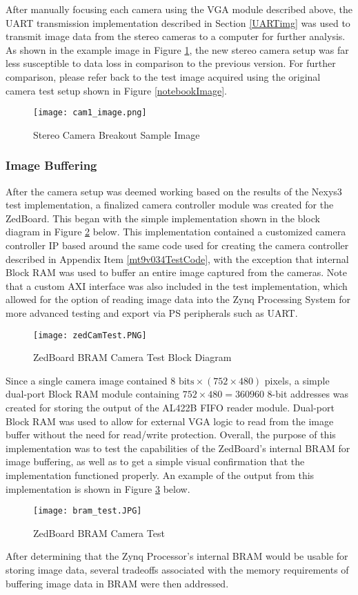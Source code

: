 \par
After manually focusing each camera using the VGA module described above, the UART transmission implementation described in Section \ref{UARTimg} was used to transmit image data from the stereo cameras to a computer for further analysis. As shown in the example image in Figure \ref{newBoardImage}, the new stereo camera setup was far less susceptible to data loss in comparison to the previous version. For further comparison, please refer back to the test image acquired using the original camera test setup shown in Figure \ref{notebookImage}.
\begin{figure}[H] 
	\centering
	\texttt{[image: cam1\_image.png]}
	\caption{Stereo Camera Breakout Sample Image}
	\label{newBoardImage}
\end{figure}

\subsubsection{Image Buffering}
After the camera setup was deemed working based on the results of the Nexys3 test implementation, a finalized camera controller module was created for the ZedBoard. This began with the simple implementation shown in the block diagram in Figure \ref{zedCamTest} below. This implementation contained a customized camera controller IP based around the same code used for creating the camera controller described in Appendix Item \ref{mt9v034TestCode}, with the exception that internal Block RAM was used to buffer an entire image captured from the cameras. Note that a custom AXI interface was also included in the test implementation, which allowed for the option of reading image data into the Zynq Processing System for more advanced testing and export via PS peripherals such as UART. 
\begin{figure}[H] 
	\centering
	\texttt{[image: zedCamTest.PNG]}
	\caption{ZedBoard BRAM Camera Test Block Diagram}
	\label{zedCamTest}
\end{figure}
\par
Since a single camera image contained $8 \textrm{ bits} \times (752\times 480)$ pixels, a simple dual-port Block RAM module containing $752\times480=360960$ 8-bit addresses was created for storing the output of the AL422B FIFO reader module. Dual-port Block RAM was used to allow for external VGA logic to read from the image buffer without the need for read/write protection. Overall, the purpose of this implementation was to test the capabilities of the ZedBoard's internal BRAM for image buffering, as well as to get a simple visual confirmation that the implementation functioned properly. An example of the output from this implementation is shown in Figure \ref{bramCamTest} below. 
\begin{figure}[H] 
	\centering
	\texttt{[image: bram\_test.JPG]}
	\caption{ZedBoard BRAM Camera Test}
	\label{bramCamTest}
\end{figure}
\par
After determining that the Zynq Processor's internal BRAM would be usable for storing image data, several tradeoffs associated with the memory requirements of buffering image data in BRAM were then addressed. 

